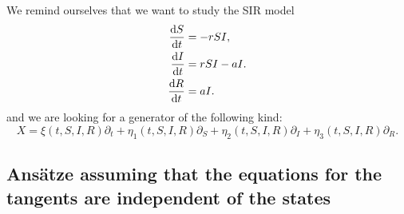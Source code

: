 We remind ourselves that we want to study the SIR model
\begin{equation*}
  \begin{split}
    \dv{S}{t}&=-rSI,\\
    \dv{I}{t}&=rSI-aI.\\
    \dv{R}{t}&=aI.\\    
    \end{split}
  \end{equation*}
  and we are looking for a generator of the following kind:
\begin{equation}
X=\xi(t,S,I,R)\partial_t+\eta_1(t,S,I,R)\partial_S+\eta_2(t,S,I,R)\partial_I+\eta_3(t,S,I,R)\partial_R.
\end{equation}
\subsection{Ans\"atze assuming that the equations for the tangents are independent of the states}